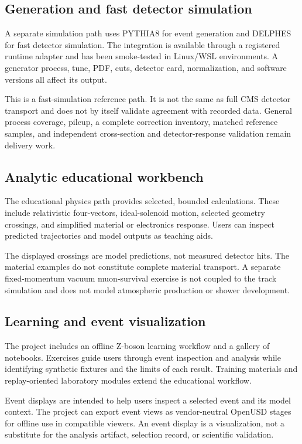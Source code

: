 \documentclass[11pt,a4paper]{article}
\begin{document}
\subsection{Generation and fast detector simulation}

A separate simulation path uses PYTHIA8 for event generation and DELPHES for
fast detector simulation. The integration is available through a registered
runtime adapter and has been smoke-tested in Linux/WSL environments. A
generator process, tune, PDF, cuts, detector card, normalization, and software
versions all affect its output.

This is a fast-simulation reference path. It is not the same as full CMS
detector transport and does not by itself validate agreement with recorded
data. General process coverage, pileup, a complete correction inventory,
matched reference samples, and independent cross-section and detector-response
validation remain delivery work.

\subsection{Analytic educational workbench}

The educational physics path provides selected, bounded calculations. These
include relativistic four-vectors, ideal-solenoid motion, selected geometry
crossings, and simplified material or electronics response. Users can inspect
predicted trajectories and model outputs as teaching aids.

The displayed crossings are model predictions, not measured detector hits.
The material examples do not constitute complete material transport. A
separate fixed-momentum vacuum muon-survival exercise is not coupled to the
track simulation and does not model atmospheric production or shower
development.

\subsection{Learning and event visualization}

The project includes an offline Z-boson learning workflow and a gallery of
notebooks. Exercises guide users through event inspection and analysis while
identifying synthetic fixtures and the limits of each result. Training
materials and replay-oriented laboratory modules extend the educational
workflow.

Event displays are intended to help users inspect a selected event and its
model context. The project can export event views as vendor-neutral OpenUSD
stages for offline use in compatible viewers. An event display is a
visualization, not a substitute for the analysis artifact, selection record,
or scientific validation.
\end{document}
